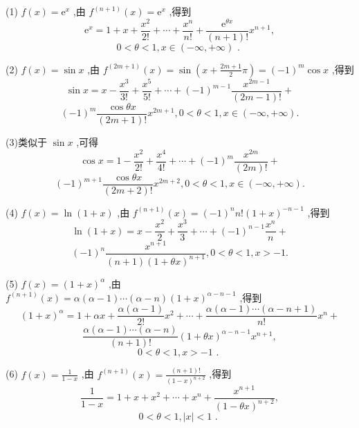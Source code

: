 \begin{solution}
(1) \(f\left( x\right)  = {\mathrm{e}}^{x}\) ,由 \({f}^{\left( n + 1\right) }\left( x\right)  = {\mathrm{e}}^{x}\) ,得到
\[
{\mathrm{e}}^{x} = 1 + x + \frac{{x}^{2}}{2!} + \cdots  + \frac{{x}^{n}}{n!} + \frac{{\mathrm{e}}^{\theta x}}{\left( {n + 1}\right) !}{x}^{n + 1},
\]
\[
0 < \theta  < 1,x \in  \left( {-\infty , + \infty }\right) \text{ . }
\]

(2) \(f\left( x\right)  = \sin x\) ,由 \({f}^{\left( 2m + 1\right) }\left( x\right)  = \sin \left( {x + \frac{{2m} + 1}{2}\pi }\right)  = {\left( -1\right) }^{m}\cos x\) ,得到
\[
\sin x = x - \frac{{x}^{3}}{3!} + \frac{{x}^{5}}{5!} + \cdots  + {\left( -1\right) }^{m - 1}\frac{{x}^{{2m} - 1}}{\left( {{2m} - 1}\right) !} +
\]
\[
{\left( -1\right) }^{m}\frac{\cos {\theta x}}{\left( {{2m} + 1}\right) !}{x}^{{2m} + 1},0 < \theta  < 1,x \in  \left( {-\infty , + \infty }\right) .
\]

(3)类似于 \(\sin x\) ,可得
\[
\cos x = 1 - \frac{{x}^{2}}{2!} + \frac{{x}^{4}}{4!} + \cdots  + {\left( -1\right) }^{m}\frac{{x}^{2m}}{\left( {2m}\right) !} +
\]
\[
{\left( -1\right) }^{m + 1}\frac{\cos {\theta x}}{\left( {{2m} + 2}\right) !}{x}^{{2m} + 2},0 < \theta  < 1,x \in  \left( {-\infty , + \infty }\right) .
\]

(4) \(f\left( x\right)  = \ln \left( {1 + x}\right)\) ,由 \({f}^{\left( n + 1\right) }\left( x\right)  = {\left( -1\right) }^{n}n!{\left( 1 + x\right) }^{-n - 1}\) ,得到
\[
\ln \left( {1 + x}\right)  = x - \frac{{x}^{2}}{2} + \frac{{x}^{3}}{3} + \cdots  + {\left( -1\right) }^{n - 1}\frac{{x}^{n}}{n} +
\]
\[
{\left( -1\right) }^{n}\frac{{x}^{n + 1}}{\left( {n + 1}\right) {\left( 1 + \theta x\right) }^{n + 1}},0 < \theta  < 1,x >  - 1.
\]

(5) \(f\left( x\right)  = {\left( 1 + x\right) }^{\alpha }\) ,由 \({f}^{\left( n + 1\right) }\left( x\right)  = \alpha \left( {\alpha  - 1}\right) \cdots \left( {\alpha  - n}\right) {\left( 1 + x\right) }^{\alpha  - n - 1}\) ,得到
\[
{\left( 1 + x\right) }^{\alpha } = 1 + {\alpha x} + \frac{\alpha \left( {\alpha  - 1}\right) }{2!}{x}^{2} + \cdots  + \frac{\alpha \left( {\alpha  - 1}\right) \cdots \left( {\alpha  - n + 1}\right) }{n!}{x}^{n} +
\]
\[
\frac{\alpha \left( {\alpha  - 1}\right) \cdots \left( {\alpha  - n}\right) }{\left( {n + 1}\right) !}{\left( 1 + \theta x\right) }^{\alpha  - n - 1}{x}^{n + 1},
\]
\[
0 < \theta  < 1,x >  - 1\text{ . }
\]

(6) \(f\left( x\right)  = \frac{1}{1 - x}\) ,由 \({f}^{\left( n + 1\right) }\left( x\right)  = \frac{\left( {n + 1}\right) !}{{\left( 1 - x\right) }^{n + 2}}\) ,得到
\[
\frac{1}{1 - x} = 1 + x + {x}^{2} + \cdots  + {x}^{n} + \frac{{x}^{n + 1}}{{\left( 1 - \theta x\right) }^{n + 2}},
\]
\[
0 < \theta  < 1,\left| x\right|  < 1\text{ . }
\]
\end{solution}

